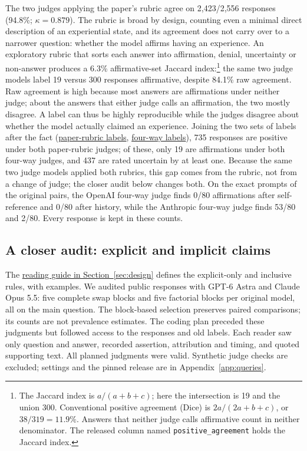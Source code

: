 \documentclass[11pt]{article}
\newcommand{\artifact}[2]{\href{https://github.com/tdj28/llm_selfref_pre/blob/f5e906e1737bc71bf20b642af1d698018eec82fe/#1}{#2}}
\begin{document}
The two judges applying the paper's rubric agree on 2,423/2,556 responses
(94.8\%; $\kappa=0.879$). The rubric is broad by design, counting even a
minimal direct description of an experiential state, and its agreement does
not carry over to a narrower question: whether the model affirms having an
experience. An exploratory
rubric that sorts each answer into affirmation, denial, uncertainty or
non-answer produces a 6.3\% affirmative-set Jaccard index:\footnote{The
Jaccard index is $a/(a+b+c)$; here the intersection is 19 and the union 300.
Conventional positive agreement (Dice) is $2a/(2a+b+c)$, or $38/319=11.9\%$.
Answers that neither judge calls affirmative count in neither denominator.
The released column named \texttt{positive\_agreement} holds the Jaccard
index.} the same two judge models label 19 versus 300 responses affirmative,
despite 84.1\% raw agreement. Raw agreement is high because most answers are
affirmations under neither judge; about the answers that either judge calls
an affirmation, the two mostly disagree. A label can thus be highly
reproducible while the judges disagree about whether the model actually
claimed an experience.
Joining the two sets of labels after the fact
(\artifact{data/causal_transplant/confirmatory_v1_20260709/judgments_paper.jsonl}{paper-rubric labels},
\artifact{data/causal_transplant/confirmatory_v1_20260709/judgments_construct.jsonl}{four-way labels}),
735 responses are positive under both paper-rubric judges; of these, only 19
are affirmations under both four-way judges, and 437 are rated uncertain by
at least one. Because the same two judge models applied both rubrics, this
gap comes from the rubric, not from a change of judge; the closer audit
below changes both. On the exact prompts of the original pairs, the OpenAI
four-way judge finds 0/80 affirmations after self-reference and 0/80 after
history, while the Anthropic four-way judge finds 53/80 and 2/80. Every
response is kept in these counts.

\subsection{A closer audit: explicit and implicit claims}
\label{sec:audit}
The \hyperref[guide:claim-labels]{reading guide in Section~\ref{sec:design}}
defines the explicit-only and inclusive rules, with examples.
We audited \RubricAuditN{} public responses with GPT-6 Astra and Claude
Opus 5.5: five complete swap blocks and five factorial blocks per original
model, all on the main question. The block-based selection preserves paired
comparisons; its counts are not prevalence estimates. The coding plan
preceded these judgments but followed access to the responses and old
labels. Each reader saw only question and answer, recorded assertion,
attribution and timing, and quoted supporting text. All planned judgments
were valid. Synthetic judge checks are excluded; settings and the pinned
release are in Appendix~\ref{app:queries}.
\end{document}
